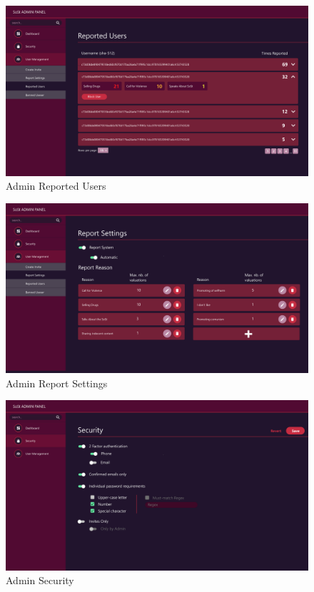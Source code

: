 \begin{figure}[h]
    \centering
    \includegraphics[width=1.0\textwidth]{./graphics/wireframes/AdminReportedUsers}
    \caption{Admin Reported Users}
    \label{fig:figure11}
\end{figure}

\begin{figure}[h]
    \centering
    \includegraphics[width=1.0\textwidth]{./graphics/wireframes/AdminReportSettings}
    \caption{Admin Report Settings}
    \label{fig:figure12}
\end{figure}

\begin{figure}[h]
    \centering
    \includegraphics[width=1.0\textwidth]{./graphics/wireframes/AdminSecurity}
    \caption{Admin Security}
    \label{fig:figure13}
\end{figure}

